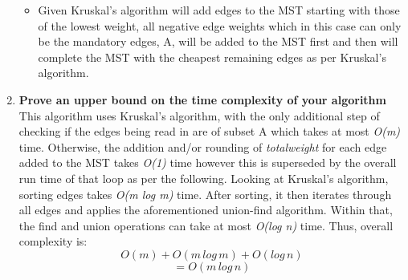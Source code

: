 \documentclass[11pt, oneside]{article}   	%
\begin{document}
\begin{enumerate}[label=(\alph*)]
\begin{itemize}
\item Given Kruskal's algorithm will add edges to the MST starting with those of the lowest weight, all negative edge weights which in this case can only be the mandatory edges, A, will be added to the MST first and then will complete the MST with the cheapest remaining edges as per Kruskal's algorithm.
\end{itemize}
\item{\textbf{Prove an upper bound on the time complexity of your algorithm}}\\
This algorithm uses Kruskal's algorithm, with the only additional step of checking if the edges being read in are of subset A which takes at most \textit{O(m)} time. Otherwise, the addition and/or rounding of \textit{totalweight} for each edge added to the MST takes \textit{O(1)} time however this is superseded by the overall run time of that loop as per the following. Looking at Kruskal's algorithm, sorting edges takes \textit{O(m log m)} time. After sorting, it then iterates through all edges and applies the aforementioned union-find algorithm. Within that, the find and union operations can take at most \textit{O(log n)} time. Thus, overall complexity is:
\[ O(m) + O(m\, log\, m) + O(log\, n) \]
\[ = O( m\, log\, n ) \]
\end{enumerate}
\end{document}
